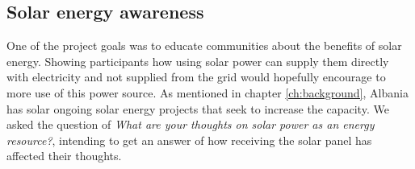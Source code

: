 \subsection{Solar energy awareness}
One of the project goals was to educate communities about the benefits of solar energy. Showing participants how using solar power can supply them directly with electricity and not supplied from the grid would hopefully encourage to more use of this power source. As mentioned in chapter \ref{ch:background}, Albania has solar ongoing solar energy projects that seek to increase the capacity. We asked the question of \textit{What are your thoughts on solar power as an energy resource?}, intending to get an answer of how receiving the solar panel has affected their thoughts. 

